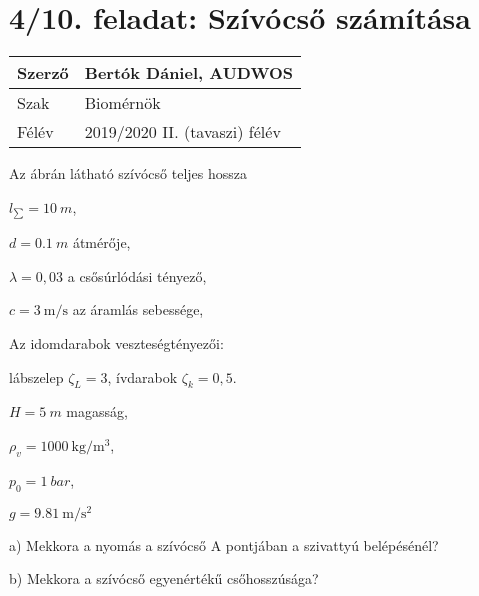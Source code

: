 \section*{4/10. feladat: Szívócső számítása}




\begin{tabular}{ | p{2cm} | p{14cm} | } 
	\hline
	Szerző & Bertók Dániel, AUDWOS \\ 
	\hline
	Szak & Biomérnök \\ 
	\hline
	Félév & 2019/2020 II. (tavaszi) félév \\ 
	\hline
\end{tabular}
\vspace{0.5cm}


\noindent Az ábrán látható szívócső teljes hossza

$l_\sum= \SI{10}{m}$,

$d= \SI{0,1}{m}$ átmérője,

$\lambda= 0,03$ a csősúrlódási tényező,

$c= \SI{3}{\meter\per\second}$ az áramlás sebessége,

Az idomdarabok veszteségtényezői:

lábszelep $\zeta_L= 3$, ívdarabok $\zeta_k= 0,5$.

$H= \SI{5}{m}$ magasság,

$\rho_v= \SI{1000}{\kilogram\per\meter\cubed}$,

$p_0= \SI{1}{bar}$,

$g= \SI{9,81}{\meter\per\second\squared}$ 

a) Mekkora a nyomás a szívócső A pontjában a szivattyú belépésénél?

b) Mekkora a szívócső egyenértékű csőhosszúsága?




\noindent\hrulefill